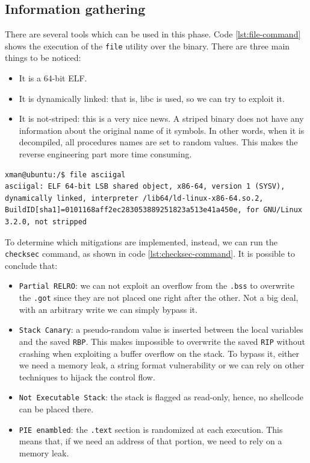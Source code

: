 \documentclass{article}
\numberwithin{equation}{subsection}
\begin{document}
\subsection{Information gathering}
There are several tools which can be used in this phase.
Code \ref{lst:file-command} shows the execution of the \texttt{file} utility over the binary. There are three main things to be noticed:
\begin{itemize}
    \item It is a 64-bit ELF.
    \item It is dynamically linked: that is, libc is used, so we can try to exploit it.
    \item It is not-striped: this is a very nice news. A striped binary does not have any information about the original name of it symbols. In other words, when it is decompiled, all procedures names are set to random values. This makes the reverse engineering part more time consuming.
\end{itemize}
\begin{minipage}{\textwidth}
\centering
\lstset{style=consolestyle}
\begin{lstlisting}[caption={File command on asciigal executable.},captionpos=b,label={lst:file-command}]
xman@ubuntu:/$ file asciigal
asciigal: ELF 64-bit LSB shared object, x86-64, version 1 (SYSV), dynamically linked, interpreter /lib64/ld-linux-x86-64.so.2, BuildID[sha1]=0101168aff2ec283053889251823a513e41a450e, for GNU/Linux 3.2.0, not stripped
\end{lstlisting}
\end{minipage}
To determine which mitigations are implemented, instead, we can run the \texttt{checksec} command, as shown in code \ref{lst:checksec-command}. It is possible to conclude that:
\begin{itemize}
    \item \texttt{Partial RELRO}: we can not exploit an overflow from the \texttt{.bss} to overwrite the \texttt{.got} since they are not placed one right after the other. Not a big deal, with an arbitrary write we can simply bypass it.
    \item \texttt{Stack Canary}: a pseudo-random value is inserted between the local variables and the saved \texttt{RBP}. This makes impossible to overwrite the saved \texttt{RIP} without crashing when exploiting a buffer overflow on the stack. To bypass it, either we need a memory leak, a string format vulnerability or we can rely on other techniques to hijack the control flow.
    \item \texttt{Not Executable Stack}: the stack is flagged as read-only, hence, no shellcode can be placed there.
    \item \texttt{PIE enambled}: the \texttt{.text} section is randomized at each execution. This means that, if we need an address of that portion, we need to rely on a memory leak.
\end{itemize}
\end{document}
